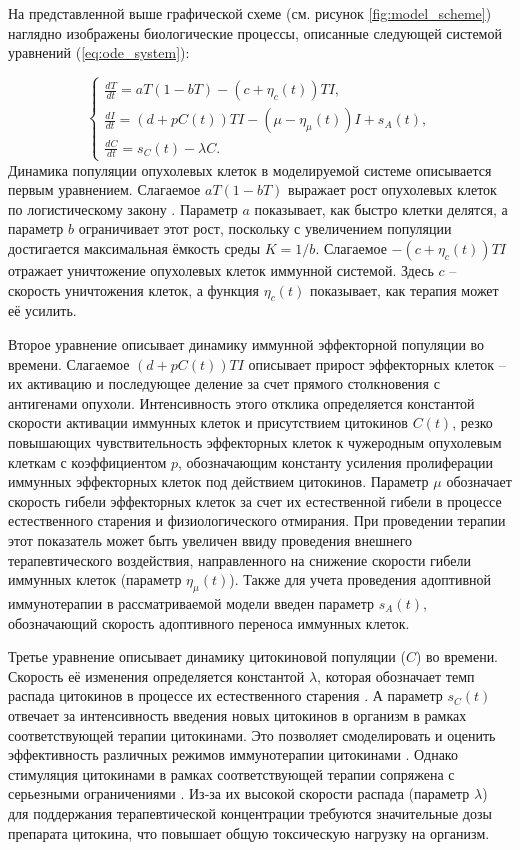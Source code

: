 На представленной выше графической схеме (см. рисунок \ref{fig:model_scheme})
наглядно изображены биологические процессы, описанные следующей системой уравнений
(\ref{eq:ode_system}):

\begin{equation}
  \label{eq:ode_system}
  \begin{cases}
    \frac{dT}{dt} = aT (1 - bT) - (c + \eta_c(t)) TI, \\
    \frac{dI}{dt} = (d + pC(t)) TI - (\mu - \eta_{\mu}(t))I + s_A(t), \\
    \frac{dC}{dt} = s_C(t) - \lambda C.
  \end{cases}
\end{equation}
Динамика популяции опухолевых клеток в моделируемой системе описывается первым уравнением.
Слагаемое $aT(1-bT)$ выражает рост опухолевых клеток по логистическому закону
\cite{logistic_growth}.
Параметр $a$ показывает, как быстро клетки делятся, а параметр $b$ ограничивает этот рост,
поскольку с увеличением популяции достигается максимальная ёмкость среды $K=1/b$.
Слагаемое $-(c+\eta_c(t))TI$ отражает уничтожение опухолевых клеток иммунной системой.
Здесь $c$ -- скорость уничтожения клеток, а функция $\eta_c(t)$ показывает, как терапия
может её усилить.

Второе уравнение описывает динамику иммунной эффекторной популяции во времени.
Слагаемое $(d+pC(t))TI$ описывает прирост эффекторных клеток -- их активацию и
последующее деление за счет прямого столкновения с антигенами опухоли.
Интенсивность этого отклика определяется константой скорости активации иммунных
клеток и присутствием цитокинов $C(t)$, резко повышающих чувствительность
эффекторных клеток к чужеродным опухолевым клеткам с коэффициентом $p$,
обозначающим константу усиления пролиферации иммунных эффекторных клеток под
действием цитокинов.
Параметр $\mu$ обозначает скорость гибели эффекторных клеток за счет их
естественной гибели в процессе естественного старения и физиологического отмирания.
При проведении терапии этот показатель может быть увеличен ввиду проведения
внешнего терапевтического воздействия, направленного на снижение скорости
гибели иммунных клеток (параметр $\eta_{\mu}(t)$). Также для учета проведения
адоптивной иммунотерапии в рассматриваемой модели введен параметр $s_A(t)$,
обозначающий скорость адоптивного переноса иммунных клеток.

Третье уравнение описывает динамику цитокиновой популяции ($C$) во времени.
Скорость её изменения определяется константой $\lambda$, которая обозначает
темп распада цитокинов в процессе их естественного старения
\cite{cytokine_pharmacokinetics}. А параметр
$s_C(t)$ отвечает за интенсивность введения новых цитокинов в организм в рамках
соответствующей терапии цитокинами. Это позволяет смоделировать и оценить
эффективность различных режимов иммунотерапии цитокинами \cite{il2_pharmacokinetics}.
Однако стимуляция цитокинами в рамках соответствующей терапии сопряжена с
серьезными ограничениями \cite{cytokines_in_cancer_sys}. Из-за их высокой скорости
распада (параметр $\lambda$) для поддержания терапевтической концентрации
требуются значительные дозы препарата цитокина, что повышает общую токсическую
нагрузку на организм.

